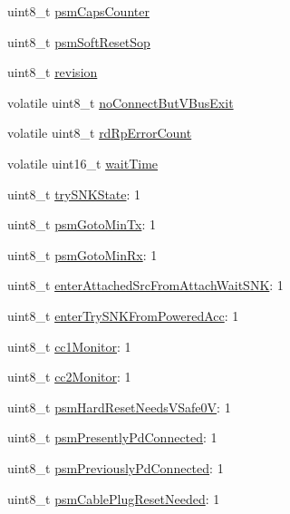 \begin{DoxyCompactItemize}
uint8\-\_\-t \hyperlink{struct__pd__instance_aec485d99451925aec7a6237f92791cd3}{psm\-Caps\-Counter}
\item 
uint8\-\_\-t \hyperlink{struct__pd__instance_a80a39754275c80b96db63d02b7e049ec}{psm\-Soft\-Reset\-Sop}
\item 
uint8\-\_\-t \hyperlink{struct__pd__instance_af7c28b72771ce442ee733892186c4e6c}{revision}
\item 
volatile uint8\-\_\-t \hyperlink{struct__pd__instance_abb01fbdcfbc66eba6c7d5d85e91e62e4}{no\-Connect\-But\-V\-Bus\-Exit}
\item 
volatile uint8\-\_\-t \hyperlink{struct__pd__instance_a46b9d34b21328c188c161825bf8e8217}{rd\-Rp\-Error\-Count}
\item 
volatile uint16\-\_\-t \hyperlink{struct__pd__instance_a2505651a0001ea647306dbd800927778}{wait\-Time}
\item 
uint8\-\_\-t \hyperlink{struct__pd__instance_a88df7992251beb09fa2888f4ddf9766f}{try\-S\-N\-K\-State}\-: 1
\item 
uint8\-\_\-t \hyperlink{struct__pd__instance_ac25d2d3e3181280ef797e42323c60053}{psm\-Goto\-Min\-Tx}\-: 1
\item 
uint8\-\_\-t \hyperlink{struct__pd__instance_af189a6cdfc3021280df10fe8a7a86a8f}{psm\-Goto\-Min\-Rx}\-: 1
\item 
uint8\-\_\-t \hyperlink{struct__pd__instance_aea1b390f81517cb7ef24eacda944f4ec}{enter\-Attached\-Src\-From\-Attach\-Wait\-S\-N\-K}\-: 1
\item 
uint8\-\_\-t \hyperlink{struct__pd__instance_a83ce4a62d8bb8f280b4fb7fdbcdc8d5a}{enter\-Try\-S\-N\-K\-From\-Powered\-Acc}\-: 1
\item 
uint8\-\_\-t \hyperlink{struct__pd__instance_ae190e16d15f42371ac82937f08371c98}{cc1\-Monitor}\-: 1
\item 
uint8\-\_\-t \hyperlink{struct__pd__instance_af6e379f0550864c814e92c07732b6ea9}{cc2\-Monitor}\-: 1
\item 
uint8\-\_\-t \hyperlink{struct__pd__instance_a817d87a8494e9f703f8854e7fdf32dfd}{psm\-Hard\-Reset\-Needs\-V\-Safe0\-V}\-: 1
\item 
uint8\-\_\-t \hyperlink{struct__pd__instance_afc95df19affca8d292c845f328349f8f}{psm\-Presently\-Pd\-Connected}\-: 1
\item 
uint8\-\_\-t \hyperlink{struct__pd__instance_ab15695a76307bdc413424030ad701a47}{psm\-Previously\-Pd\-Connected}\-: 1
\item 
uint8\-\_\-t \hyperlink{struct__pd__instance_a7be408d709efe6ec210d68a3d4098cc9}{psm\-Cable\-Plug\-Reset\-Needed}\-: 1

\end{DoxyCompactItemize}
